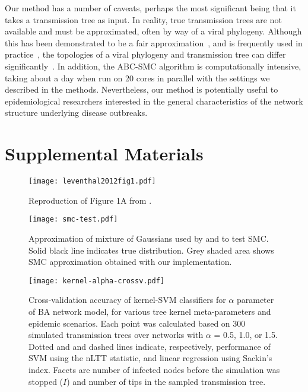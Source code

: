 \documentclass[12pt]{article}\usepackage[]{graphicx}\usepackage[]{color}
\begin{document}
Our method has a number of caveats, perhaps the most significant being that it
takes a transmission tree as input. In reality, true transmission trees are not
available and must be approximated, often by way of a viral phylogeny. Although
this has been demonstrated to be a fair
approximation~\autocite[e.g.][]{leitner1996accurate}, and is frequently used in
practice~\autocite[e.g.][]{stadler2013uncovering}, the topologies of a viral
phylogeny and transmission tree can differ
significantly~\autocite{ypma2013relating}. In addition, the \gls{ABC}-\gls{SMC}
algorithm is computationally intensive, taking about a day when run on 20 cores
in parallel with the settings we described in the methods. Nevertheless, our
method is potentially useful to epidemiological researchers interested in the
general characteristics of the network structure underlying disease outbreaks.

\setcounter{figure}{0}
\renewcommand{\thefigure}{S\arabic{figure}}

\printbibliography

\newpage
\section*{Supplemental Materials}

\begin{figure}[ht]
  \centering
  \texttt{[image: leventhal2012fig1.pdf]}
  \caption{Reproduction of Figure 1A from \textcite{leventhal2012inferring}.}
  \label{fig:sf1}
\end{figure}

\begin{figure}[ht]
  \centering
  \texttt{[image: smc-test.pdf]}
  \caption{Approximation of mixture of Gaussians used by
    \textcite{del2012adaptive} and \textcite{sisson2007sequential} to test
    \gls{SMC}. Solid black line indicates true distribution. Grey shaded area
    shows SMC approximation obtained with our implementation.}
  \label{fig:smctest}
\end{figure}

\begin{figure}[ht]
  \centering
  \texttt{[image: kernel-alpha-crossv.pdf]}
  \caption{
    Cross-validation accuracy of kernel-SVM classifiers for $\alpha$ parameter
    of \gls{BA} network model, for various tree kernel meta-parameters and
    epidemic scenarios. Each point was calculated based on 300 simulated
    transmission trees over networks with $\alpha$ = 0.5, 1.0, or 1.5. Dotted
    and and dashed lines indicate, respectively, performance of SVM using the
    \gls{nLTT} statistic, and linear regression using Sackin's index. Facets
    are number of infected nodes before the simulation was stopped ($I$) and
    number of tips in the sampled transmission tree.
  }
  \label{fig:alphacrossv}
\end{figure}
\end{document}
